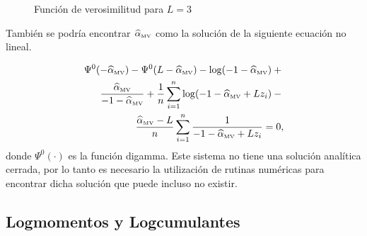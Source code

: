 \begin{figure}[hbt]
	\centering    
	 \qquad
	\caption{\label{MV} Función de verosimilitud para $L=3$}
\end{figure}

También se podría encontrar $\widehat{\alpha}_{{\text{\tiny{MV}}}}$ como la solución de la siguiente ecuación no lineal.

\begin{align}
\label{rootML}
\Psi^0(-\widehat{\alpha}_{{\text{\tiny{MV}}}})-\Psi^0(L-\widehat{\alpha}_{{\text{\tiny{MV}}}})-\log(-1-\widehat{\alpha}_{{\text{\tiny{MV}}}})+{} \nonumber\\
\frac{\widehat{\alpha}_{{\text{\tiny{MV}}}}}{-1-\widehat{\alpha}_{{\text{\tiny{MV}}}}}+
\frac{1}{n}\sum_{i=1}^n{\log(-1-\widehat{\alpha}_{{\text{\tiny{MV}}}}+Lz_i)}-{}
\nonumber
\\ \frac{\widehat{\alpha}_{{\text{\tiny{MV}}}}-L}{n}\sum_{i=1}^n \frac1{-1-\widehat{\alpha}_{{\text{\tiny{MV}}}}+Lz_i}= 0, 
\end{align}
donde $\Psi^0(\cdot)$ es la función digamma. Este sistema no tiene una solución analítica cerrada, por lo tanto es necesario la utilización de rutinas numéricas para encontrar dicha solución que puede incluso no existir.

\subsection{Logmomentos y Logcumulantes}


